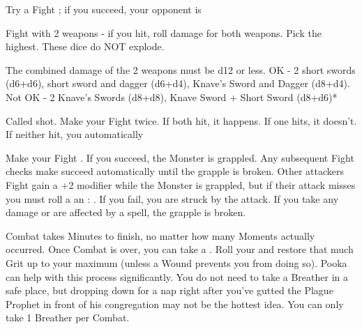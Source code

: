 {  

  Try a Fight \RO; if you succeed, your opponent is 


  Fight with 2 weapons - if you hit, roll damage for both weapons.  Pick the highest. These dice do NOT explode.

  The combined damage of the 2 weapons must be d12 or less.  OK - 2 short swords (d6+d6), short sword and dagger (d6+d4), Knave's Sword and Dagger (d8+d4).  Not OK - 2 Knave's Swords (d8+d8), Knave Sword + Short Sword (d8+d6)*


  Called shot.  Make your Fight \RO twice.  If both hit, it happens.  If one hits, it doesn't.  If neither hit, you automatically 



  Make your Fight \RO.  If you succeed, the Monster is grappled.  Any subsequent Fight checks  make succeed automatically until the grapple is broken.  Other attackers Fight \RO gain a +2 modifier while the Monster is grappled, but if their attack misses you must roll a an \RS : \DEX.  If you fail, you are struck by the attack.  If you take any damage or are affected by a spell, the grapple is broken.





  Combat takes Minutes to finish, no matter how many Moments actually occurred.  Once Combat is over, you can take a .  Roll your \HD and restore that much Grit up to your maximum (unless a Wound prevents you from doing so).  Pooka can help with this process significantly.  You do not need to take a Breather in a safe place, but dropping down for a nap right after you've gutted the Plague Prophet in front of his congregation may not be the hottest idea.  You can only take 1 Breather per Combat.  


}
